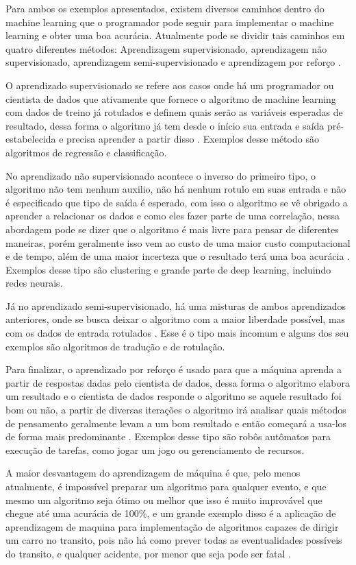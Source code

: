Para ambos os exemplos apresentados, existem diversos caminhos dentro do machine learning que o programador pode seguir para implementar o machine learning e obter uma boa acurácia. Atualmente pode se dividir tais caminhos em quatro diferentes métodos: Aprendizagem supervisionado, aprendizagem não supervisionado, aprendizagem semi-supervisionado e aprendizagem por reforço \cite{Russell2009}.

O aprendizado supervisionado se refere aos casos onde há um programador ou cientista de dados que ativamente que fornece o algoritmo de machine learning com dados de treino já rotulados e definem quais serão as variáveis esperadas de resultado, dessa forma o algoritmo já tem desde o início sua entrada e saída pré-estabelecida e precisa aprender a partir disso \cite{Russell2009}. 
Exemplos desse método são algoritmos de regressão e classificação.

No aprendizado não supervisionado acontece o inverso do primeiro tipo, o algoritmo não tem nenhum auxilio, não há nenhum rotulo em suas entrada e não é especificado que tipo de saída é esperado, com isso o algoritmo se vê obrigado a aprender a relacionar os dados e como eles fazer parte de uma correlação, nessa abordagem pode se dizer que o algoritmo é mais livre para pensar de diferentes maneiras, porém geralmente isso vem ao custo de uma maior custo computacional e de tempo, além de uma maior incerteza que o resultado terá uma boa acurácia \cite{ed2021}. 
Exemplos desse tipo são clustering e grande parte de deep learning, incluindo redes neurais.

Já no aprendizado semi-supervisionado, há uma misturas de ambos aprendizados anteriores, onde se busca deixar o algoritmo com a maior liberdade possível, mas com os dados de entrada rotulados \cite{ed2021}.
Esse é o tipo mais incomum e alguns dos seu exemplos são algoritmos de tradução e de rotulação.

Para finalizar, o aprendizado por reforço é usado para que a máquina aprenda a partir de respostas dadas pelo cientista de dados, dessa forma o algoritmo elabora um resultado e o cientista de dados responde o algoritmo se aquele resultado foi bom ou não, a partir de diversas iterações o algoritmo irá analisar quais métodos de pensamento geralmente levam a um bom resultado e então começará a usa-los de forma mais predominante \cite{Van_Otterlo2012}.
Exemplos desse tipo são robôs autômatos para execução de tarefas, como jogar um jogo ou gerenciamento de recursos.

A maior desvantagem do aprendizagem de máquina é que, pelo menos atualmente, é impossível preparar um algoritmo para qualquer evento, e que mesmo um algoritmo seja ótimo ou melhor que isso é muito improvável que chegue até uma acurácia de 100\%, e um grande exemplo disso é a aplicação de aprendizagem de maquina para implementação de algoritmos capazes de dirigir um carro no transito, pois não há como prever todas as eventualidades possíveis do transito, e qualquer acidente, por menor que seja pode ser fatal \cite{ed2021}.



